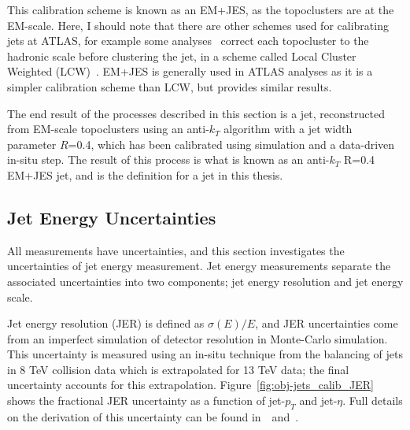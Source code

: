 This calibration scheme is known as an EM+JES, as the topoclusters are at the EM-scale.
Here, I should note that there are other schemes used for calibrating jets at ATLAS,
for example some analyses~\cite{obj-VVjj} correct each topocluster to the hadronic scale
before clustering the jet, in a scheme called Local Cluster Weighted (LCW)~\cite{obj-jets_topo}.
EM+JES is generally used in ATLAS analyses as it is a simpler calibration scheme than LCW, but provides similar results.

The end result of the processes described in this section is a jet,
reconstructed from EM-scale topoclusters using an anti-$k_T$ algorithm with a jet width parameter $R$=0.4,
which has been calibrated using simulation and a data-driven in-situ step.
The result of this process is what is known as an anti-$k_T$ R=0.4 EM+JES jet,
and is the definition for a jet in this thesis.

\subsection{Jet Energy Uncertainties}
\label{sec:obj-jets_uncert}

All measurements have uncertainties, and this section investigates the uncertainties of jet energy measurement.
Jet energy measurements separate the associated uncertainties into two components;
jet energy resolution and jet energy scale.

Jet energy resolution (JER) is defined as $\sigma(E)/E$, and JER uncertainties
come from an imperfect simulation of detector resolution in Monte-Carlo simulation.
This uncertainty is measured using an in-situ technique from the balancing of jets in 8 TeV collision data
which is extrapolated for 13 TeV data; the final uncertainty accounts for this extrapolation.
Figure~\ref{fig:obj-jets_calib_JER} shows the fractional JER uncertainty as a function of jet-$p_T$ and jet-$\eta$.
Full details on the derivation of this uncertainty can be found in~\cite{obj-jets_calib_2015}~and~\cite{obj-jets_calib_JER_8TeV}.


